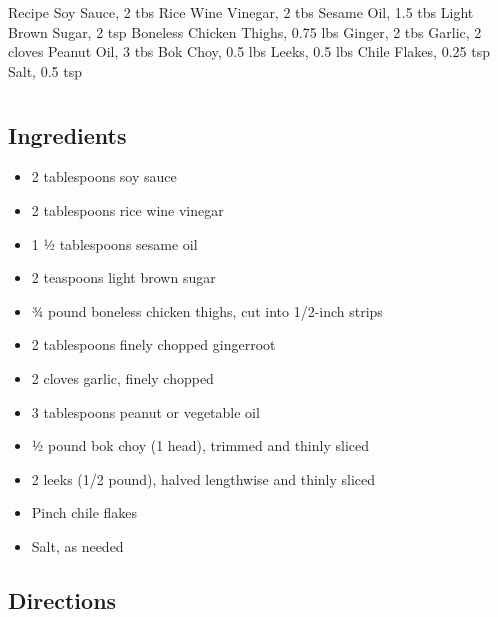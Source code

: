 Recipe
  Soy Sauce, 2 tbs
  Rice Wine Vinegar, 2 tbs
  Sesame Oil, 1.5 tbs
  Light Brown Sugar, 2 tsp
  Boneless Chicken Thighs, 0.75 lbs
  Ginger, 2 tbs
  Garlic, 2 cloves
  Peanut Oil, 3 tbs
  Bok Choy, 0.5 lbs
  Leeks, 0.5 lbs
  Chile Flakes, 0.25 tsp
  Salt, 0.5 tsp

\section{ }

\subsection{ Ingredients }

\begin{itemize}
  \item 2 tablespoons soy sauce
  \item 2 tablespoons rice wine vinegar
  \item 1 ½ tablespoons sesame oil
  \item 2 teaspoons light brown sugar
  \item ¾ pound boneless chicken thighs, cut into 1/2-inch strips
  \item 2 tablespoons finely chopped gingerroot
  \item 2 cloves garlic, finely chopped
  \item 3 tablespoons peanut or vegetable oil
  \item ½ pound bok choy (1 head), trimmed and thinly sliced
  \item 2 leeks (1/2 pound), halved lengthwise and thinly sliced
  \item Pinch chile flakes
  \item Salt, as needed

\end{itemize}

\subsection{ Directions }

